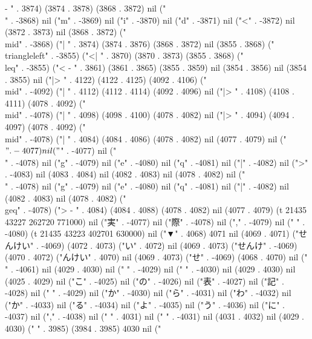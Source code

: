 -
" . 3874) (3874 . 3878) (3868 . 3872) nil ("\\" . -3868) nil ("m" . -3869) nil ("i" . -3870) nil ("d" . -3871) nil ("<" . -3872) nil (3872 . 3873) nil (3868 . 3872) ("\\mid" . -3868) ("|
" . 3874) (3874 . 3876) (3868 . 3872) nil (3855 . 3868) ("\\triangleleft" . -3855) ("<|
" . 3870) (3870 . 3873) (3855 . 3868) ("\\leq" . -3855) ("<
-
" . 3861) (3861 . 3865) (3855 . 3859) nil (3854 . 3856) nil (3854 . 3855) nil ("|>
" . 4122) (4122 . 4125) (4092 . 4106) ("\\mid" . -4092) ("|
" . 4112) (4112 . 4114) (4092 . 4096) nil ("|>
" . 4108) (4108 . 4111) (4078 . 4092) ("\\mid" . -4078) ("|
" . 4098) (4098 . 4100) (4078 . 4082) nil ("|>
" . 4094) (4094 . 4097) (4078 . 4092) ("\\mid" . -4078) ("|
" . 4084) (4084 . 4086) (4078 . 4082) nil (4077 . 4079) nil ("$" . -4077) nil ("$" . -4077) nil ("\\" . -4078) nil ("g" . -4079) nil ("e" . -4080) nil ("q" . -4081) nil ("|" . -4082) nil (">" . -4083) nil (4083 . 4084) nil (4082 . 4083) nil (4078 . 4082) nil ("\\" . -4078) nil ("g" . -4079) nil ("e" . -4080) nil ("q" . -4081) nil ("|" . -4082) nil (4082 . 4083) nil (4078 . 4082) ("\\geq" . -4078) (">
-
" . 4084) (4084 . 4088) (4078 . 4082) nil (4077 . 4079) (t 21435 43227 262720 771000) nil ("実" . -4077) nil ("際" . -4078) nil ("," . -4079) nil (" " . -4080) (t 21435 43223 402701 630000) nil ("▼" . 4068) 4071 nil (4069 . 4071) ("せんけい" . -4069) (4072 . 4073) ("い" . 4072) nil (4069 . 4073) ("せんけ" . -4069) (4070 . 4072) ("んけい" . 4070) nil (4069 . 4073) ("せ" . -4069) (4068 . 4070) nil ("
" . -4061) nil (4029 . 4030) nil ("
" . -4029) nil (" " . -4030) nil (4029 . 4030) nil (4025 . 4029) nil ("こ" . -4025) nil ("の" . -4026) nil ("表" . -4027) nil ("記" . -4028) nil ("
" . -4029) nil ("か" . -4030) nil ("ら" . -4031) nil ("わ" . -4032) nil ("か" . -4033) nil ("る" . -4034) nil ("よ" . -4035) nil ("う" . -4036) nil ("に" . -4037) nil ("," . -4038) nil ("
" . 4031) nil ("
" . -4031) nil (4031 . 4032) nil (4029 . 4030) (" " . 3985) (3984 . 3985) 4030 nil ("
